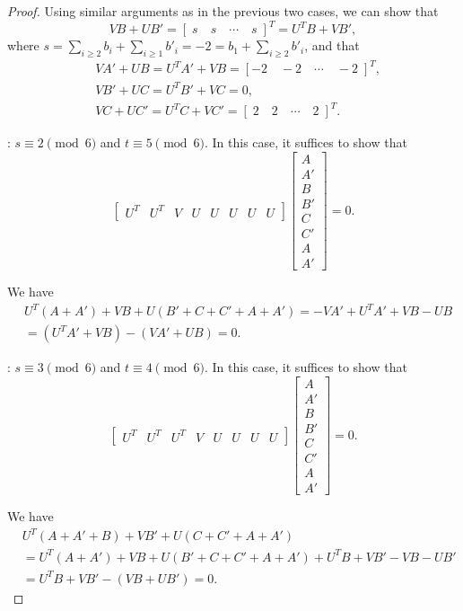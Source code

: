 \documentclass[10pt,a4paper]{amsart}
\newcommand{\A}{\mathbb{A}}
\DeclareMathOperator{\C}{\mathbb{C}}
\begin{document}
\begin{proof}
Using  similar arguments as in the previous two cases, we can show that
\[
VB+UB'= [\;s \quad s\quad\cdots\quad s\;]^T= U^TB+VB',
\]
where $s=\sum_{i\geq 2}b_i+ \sum_{i\geq 1}b'_i=-2=b_1+ \sum_{i\geq 2}b'_i$, and that
\[
\begin{aligned}
&VA'+UB=U^TA'+VB=[-2\quad -2\quad \cdots \quad -2\;]^T,\\
&VB'+UC= U^TB'+VC=0, \\
&VC+UC'=U^TC+VC'=[\;2\quad 2\quad \cdots \quad 2\;]^T.   
\end{aligned}
\]



\medskip
{}: $s\equiv 2\pmod 6$ and $t\equiv 5\pmod 6$. In this case, it suffices to show that \[\begin{bmatrix}
    U^T & U^T & V & U & U & U&U&U 
\end{bmatrix} \begin{bmatrix}
    A\\A'\\B\\B'\\C\\C'\\A\\A'
\end{bmatrix}=0.\]

We have
\[
\begin{aligned}
   &U^T(A+A')+VB+U(B'+C+C'+A+A')=-VA'+U^TA' +VB-UB \\
   &= (U^TA'+VB)-(VA'+UB)=0.
\end{aligned}
\]

\medskip
{}: $s\equiv 3\pmod 6$ and $t\equiv 4\pmod 6$. In this case, it suffices to show that \[\begin{bmatrix}
    U^T & U^T & U^T & V & U & U & U&U 
\end{bmatrix} \begin{bmatrix}
    A\\A'\\B\\B'\\C\\C'\\A\\A'
\end{bmatrix}=0.\]

We have 
\[
\begin{aligned}
&U^T(A+A'+B) + VB'+U(C+C'+A+A')\\
&=U^T(A+A')+VB+U(B'+C+C'+A+A') +U^TB+VB' -VB -UB' \\
&=U^TB+VB' -(VB +UB')=0.
\end{aligned}
\]



\end{proof}
\end{document}
